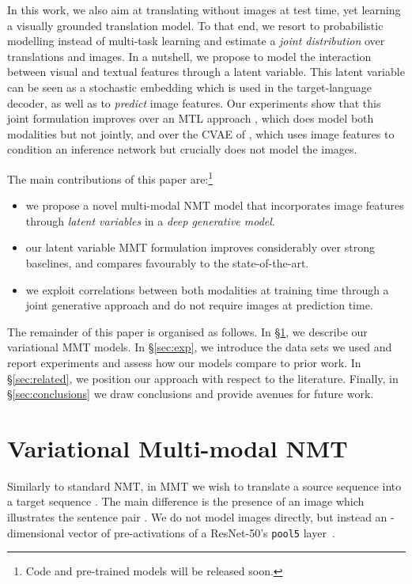 \documentclass[11pt,a4paper]{article}
\begin{document}
In this work, we also aim at translating without images at test time, yet learning a visually grounded translation model.
To that end, we resort to probabilistic modelling instead of multi-task learning and estimate a \textit{joint distribution} over translations and images.
In a nutshell, we propose to model the interaction between visual and textual features through a latent variable. This latent variable can be seen as a stochastic embedding which is used in the target-language decoder, as well as to \emph{predict} image features. 
Our experiments show that this joint formulation improves over an MTL approach \citep{ElliottKadar2017}, which does model both modalities but not jointly, and over the CVAE of \citet{Toyamaetal2016}, which uses image features to condition an inference network but crucially does not model the images.

The main contributions of this paper are:\footnote{Code and pre-trained models will be released soon.}
\begin{itemize}
  \item we propose a novel multi-modal NMT model that incorporates image features through \emph{latent variables} in a \emph{deep generative model}.
  \item our latent variable MMT formulation improves considerably over strong baselines, and compares favourably to the state-of-the-art.
  \item we exploit correlations between both modalities at training time through a joint generative approach and do not require images at prediction time.
\end{itemize}

The remainder of this paper is organised as follows.
In \S\ref{sec:models}, we describe our variational MMT models.
In \S\ref{sec:exp}, we introduce the data sets we used and report experiments and assess how our models compare to prior work.
In \S\ref{sec:related}, we position our approach with respect to the literature.
Finally, in \S\ref{sec:conclusions} we draw conclusions and provide avenues for future work. 
\section{Variational Multi-modal NMT}\label{sec:models}


Similarly to standard NMT, in MMT we wish to translate a source sequence  into a target sequence .
The main difference is the presence of an image  which illustrates the sentence pair . We do not model images directly, but instead an -dimensional vector of pre-activations of a ResNet-50's \texttt{pool5} layer~\cite{He2015}.
\end{document}
